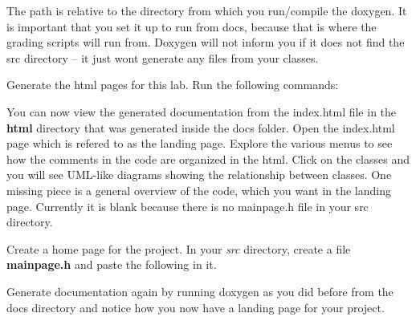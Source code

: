 The path is relative to the directory from which you run/compile the doxygen. It is important that you set it up to run from docs, because that is where the grading scripts will run from. Doxygen will not inform you if it does not find the src directory -- it just won\textquotesingle{}t generate any files from your classes.


\begin{DoxyEnumerate}
\item Generate the html pages for this lab. Run the following commands\+: 
\begin{DoxyCode}{0}
\end{DoxyCode}


You can now view the generated documentation from the index.\+html file in the {\bfseries{html}} directory that was generated inside the docs folder. Open the index.\+html page which is refered to as the landing page. Explore the various menus to see how the comments in the code are organized in the html. Click on the classes and you will see U\+M\+L-\/like diagrams showing the relationship between classes. One missing piece is a general overview of the code, which you want in the landing page. Currently it is blank because there is no mainpage.\+h file in your src directory.
\item Create a home page for the project. In your {\itshape src} directory, create a file {\bfseries{mainpage.\+h}} and paste the following in it.
\end{DoxyEnumerate}


\begin{DoxyCode}{0}
\DoxyCodeLine{ *}
\DoxyCodeLine{ *}
\DoxyCodeLine{ *}
\DoxyCodeLine{ */}
\end{DoxyCode}


Generate documentation again by running doxygen as you did before from the docs directory and notice how you now have a landing page for your project.



